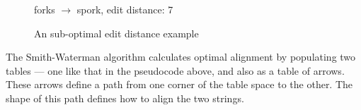 \documentclass[a4paper,11pt,twoside,notitlepage]{article}
\newcommand\CellText[2]{%
          \node[texto,left=of mat#1,anchor=east]
          at (mat#1.west)
          {\large #2};
        }
\newcommand\SlText[2]{%
          \node[texto,left=of mat#1,anchor=west,rotate=50]
          at ([xshift=1.5ex,yshift=1ex]mat#1.north)
          {\large #2};
        }
\begin{document}
        \begin{figure}[h]
          \centering   
          \vspace{3 mm}
          forks $\rightarrow$ spork, edit distance: 7
          \caption{An sub-optimal edit distance example}
          \label{fig:fork-spork-subopt}
        \end{figure}

        The Smith-Waterman algorithm calculates optimal alignment by
        populating two tables --- one like that in the pseudocode
        above, and also as a table of arrows. These arrows define a
        path from one corner of the table space to the other. The
        shape of this path defines how to align the two
        strings.\cite{Smith1981}
\end{document}
